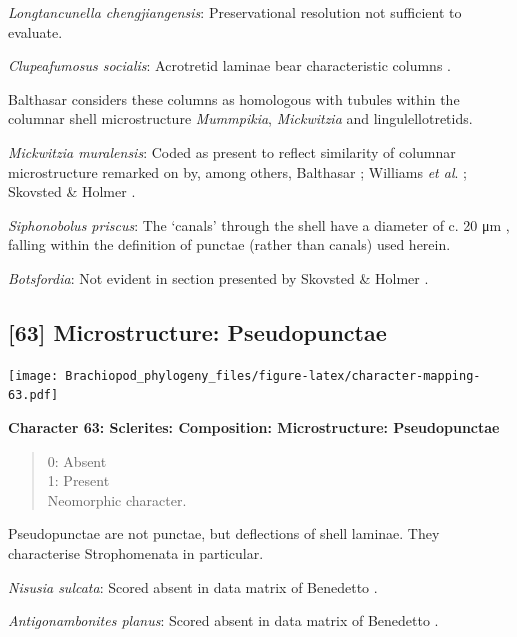 \documentclass[]{book}
\theoremstyle{definition}
\theoremstyle{definition}
\theoremstyle{definition}
\theoremstyle{remark}
\begin{document}
\emph{Longtancunella chengjiangensis}: Preservational resolution not
sufficient to evaluate.

\emph{Clupeafumosus socialis}: Acrotretid laminae bear characteristic
columns \citep[e.g.][]{Zhang2016Epithelialcell}.

Balthasar \citeyearpar{Balthasar2008iMummpikia} considers these columns
as homologous with tubules within the columnar shell microstructure
\emph{Mummpikia}, \emph{Mickwitzia} and lingulellotretids.

\emph{Mickwitzia muralensis}: Coded as present to reflect similarity of
columnar microstructure remarked on by, among others, Balthasar
\citeyearpar{Balthasar2008iMummpikia}; Williams \emph{et al}.
\citeyearpar{Williams2007PartH}; Skovsted \& Holmer
\citeyearpar{Skovsted2003EarlyCambrian}.

\emph{Siphonobolus priscus}: The `canals' through the shell have a
diameter of c. 20 μm \citep[text-fig. 2a]{Williams2004Chemicostructure},
falling within the definition of punctae (rather than canals) used
herein.

\emph{Botsfordia}: Not evident in section presented by Skovsted \&
Holmer \citeyearpar{Skovsted2003EarlyCambrian}.

\hypertarget{microstructure-pseudopunctae}{%
\subsection*{{[}63{]} Microstructure:
Pseudopunctae}\label{microstructure-pseudopunctae}}

\texttt{[image: Brachiopod\_phylogeny\_files/figure-latex/character-mapping-63.pdf]}

\textbf{Character 63: Sclerites: Composition: Microstructure:
Pseudopunctae}

\begin{quote}
0: Absent\\
1: Present\\
Neomorphic character.
\end{quote}

Pseudopunctae are not punctae, but deflections of shell laminae. They
characterise Strophomenata in particular.

\emph{Nisusia sulcata}: Scored absent in data matrix of Benedetto
\citeyearpar{Benedetto2009iChaniella}.

\emph{Antigonambonites planus}: Scored absent in data matrix of
Benedetto \citeyearpar{Benedetto2009iChaniella}.
\end{document}
